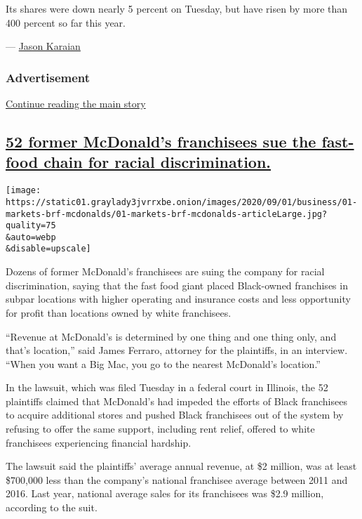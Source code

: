 Its shares were down nearly 5 percent on Tuesday, but have risen by more
than 400 percent so far this year.

--- \href{https://www.nytimes3xbfgragh.onion/by/jason-karaian}{Jason
Karaian}

\hypertarget{advertisement-3}{%
\subsubsection{Advertisement}\label{advertisement-3}}

\protect\hyperlink{after-dfp-ad-mid4}{Continue reading the main story}

\hypertarget{52-former-mcdonalds-franchisees-sue-the-fast-food-chain-for-racial-discrimination}{%
\subsection{\texorpdfstring{\protect\hyperlink{52-former-mcdonalds-franchisees-sue-the-fast-food-chain-for-racial-discrimination}{52
former McDonald's franchisees sue the fast-food chain for racial
discrimination.}}{52 former McDonald's franchisees sue the fast-food chain for racial discrimination.}}\label{52-former-mcdonalds-franchisees-sue-the-fast-food-chain-for-racial-discrimination}}

\texttt{[image: https://static01.graylady3jvrrxbe.onion/images/2020/09/01/business/01-markets-brf-mcdonalds/01-markets-brf-mcdonalds-articleLarge.jpg?quality=75\\\&auto=webp\\\&disable=upscale]}

Dozens of former McDonald's franchisees are suing the company for racial
discrimination, saying that the fast food giant placed Black-owned
franchises in subpar locations with higher operating and insurance costs
and less opportunity for profit than locations owned by white
franchisees.

``Revenue at McDonald's is determined by one thing and one thing only,
and that's location,'' said James Ferraro, attorney for the plaintiffs,
in an interview. ``When you want a Big Mac, you go to the nearest
McDonald's location.''

In the lawsuit, which was filed Tuesday in a federal court in Illinois,
the 52 plaintiffs claimed that McDonald's had impeded the efforts of
Black franchisees to acquire additional stores and pushed Black
franchisees out of the system by refusing to offer the same support,
including rent relief, offered to white franchisees experiencing
financial hardship.

The lawsuit said the plaintiffs' average annual revenue, at \$2 million,
was at least \$700,000 less than the company's national franchisee
average between 2011 and 2016. Last year, national average sales for its
franchisees was \$2.9 million, according to the suit.

